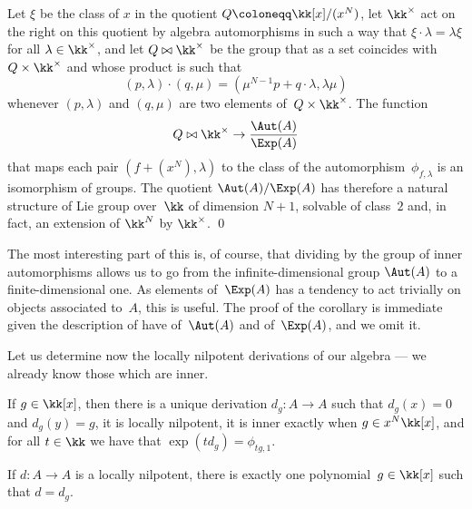 \begin{Corollary}\label{coro:aut-quot}
Let $\xi$ be the class of $x$ in the quotient $Q\coloneqq\kk[x]/(x^N)$, let
$\kk^\times$ act on the right on this quotient by algebra automorphisms in
such a way that $\xi\cdot\lambda = \lambda\xi$ for all
$\lambda\in\kk^\times$, and let $Q\bowtie\kk^\times$ be the group that as a
set coincides with $Q\times\kk^\times$ and whose product is such that
  \[
  (p,\lambda)\cdot(q,\mu) = (\mu^{N-1}p+q\cdot\lambda,\lambda\mu)
  \]
whenever $(p,\lambda)$ and $(q,\mu)$ are two elements
of~$Q\times\kk^\times$. The function
  \[
  Q\bowtie\kk^\times \to \frac{\Aut(A)}{\Exp(A)} 
  \]
that maps each pair $(f+(x^N),\lambda)$ to the class of the
automorphism~$\phi_{f,\lambda}$ is an isomorphism of groups. The quotient
$\Aut(A)/\Exp(A)$ has therefore a natural structure of Lie group over~$\kk$
of dimension $N+1$, solvable of class~$2$ and, in fact, an extension of
$\kk^N$ by $\kk^\times$. \qed
\end{Corollary}

The most interesting part of this is, of course, that dividing by the group
of inner automorphisms allows us to go from the infinite-dimensional group
$\Aut(A)$ to a finite-dimensional one. As elements of~$\Exp(A)$ has a
tendency to act trivially on objects associated to~$A$, this is useful. The
proof of the corollary is immediate given the description of have
of~$\Aut(A)$ and of~$\Exp(A)$, and we omit it.

\bigskip

Let us determine now the locally nilpotent derivations of our algebra ---
we already know those which are inner.

\begin{Proposition}\mbox{}\label{prop:lnd}
\begin{thmlist}

\item If $g\in\kk[x]$, then there is a unique derivation $d_g:A\to A$ such
that $d_g(x)=0$ and $d_g(y)=g$, it is locally nilpotent, it is inner
exactly when $g\in x^N\kk[x]$, and for all $t\in\kk$ we have that
$\exp(td_g) = \phi_{tg,1}$.

\item If $d:A\to A$ is a locally nilpotent, there is exactly one
polynomial~$g\in\kk[x]$ such that $d=d_g$.

\end{thmlist}
\end{Proposition}

